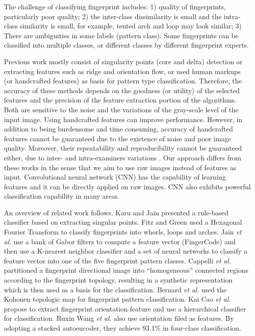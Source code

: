 
The challenge of classifying fingerprint includes: 
%
1) quality of fingerprints, particularly poor quality; 
%
2) the inter-class dissimilarity is small and the intra-class similarity is small, for example, tented arch and loop may look similar; 
%
3) There are ambiguities in some labels (pattern class). Some fingerprints can be classified into multiple classes, or different classes by different fingerprint experts.

Previous work mostly consist of singularity points (core and delta) detection or extracting features such as ridge and orientation flow, or used human markups (or handcrafted features) as basis for pattern type classification. 
%
Therefore, the accuracy of these methods depends on the goodness (or utility) of the selected features and the precision of the feature extraction portion of the algorithms. Both are sensitive to the noise and the variations of the gray-scale level of the input image.  
%
Using handcrafted features can improve performance.  However, in addition to being burdensome and time consuming, accuracy of handcrafted features cannot be guaranteed due to the existence of noise and poor image quality. 
%
Moreover, their repeatability and reproducibility cannot be guaranteed either, due to inter- and intra-examiners variations \cite{fbiBlackbox}.  
%
Our approach differs from these works in the sense that we aim to use raw images instead of features as input. Convolutional neural network (CNN) has the capability of learning features and it can be directly applied on raw images. CNN also exhibits powerful classification capability in many areas\cite{lecun2015deep}\cite{szegedy2016rethinking}.

%
An overview of related work follows. 
%
Karu and Jain \cite{karuJain1996} presented a rule-based classifier based on extracting singular points. 
%
Fitz and Green \cite{FitzGreen1996} used a Hexagonal Fourier Transform to classify fingerprints into whorls, loops and arches. 
%
Jain \textit{et al.} \cite{JainSalil1999} use a bank of Gabor filters to compute a feature vector (FingerCode) and then use a K-nearest neighbor classifier and a set of neural networks to classify a feature vector into one of the five fingerprint pattern classes.
%
Cappelli \textit{et al.} \cite{cappelli1999} partitioned a fingerprint directional image into ``homogeneous'' connected regions according to the fingerprint topology, resulting in a synthetic representation which is then used as a basis for the classification.
%
Bernard \textit{et al.} \cite{Bernard2001} used the Kohonen topologic map for fingerprint pattern classification. 
%
Kai Cao \textit{et al.}\cite{cao2013fingerprint} propose to extract fingerprint orientation feature and use a hierarchical classifier for classification.
%
Ruxin Wang \textit{et al.} \cite{wang2014fingerprint} also use orientation filed as features. By adopting a stacked autoencoder, they achieve 93.1\% in four-class classification.
 
